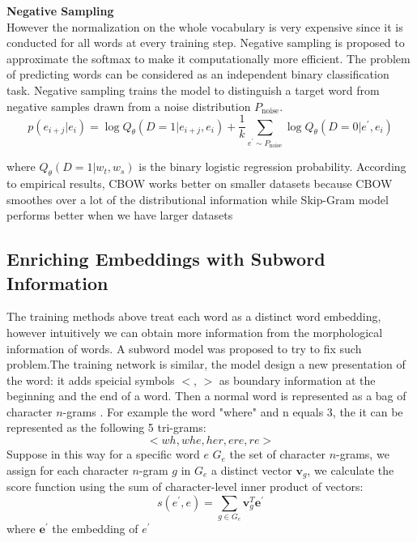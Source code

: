\textbf{Negative Sampling}\\
However the normalization on the whole vocabulary is very expensive since it is conducted for all words at every training step. Negative sampling is proposed to approximate the softmax to make it computationally more efficient. The problem of predicting words can be considered as an independent binary classification task. Negative sampling trains the model to distinguish a target word from negative samples drawn from a noise  distribution $P_{\text{noise}}$.   
\[p(e_{i+j}|e_i) = \log {Q_{\theta}{(D=1 | e_{i+j}, e_i)}} + \frac{1}{k}\sum_{e^{\prime} \sim P_{\text{noise}}} {\log{Q_{\theta}{(D=0 | e^{\prime}, e_i )}}}  \]

where ${Q_{\theta}{(D=1| w_t, w_s)}}$ is the binary logistic regression probability.
According to  empirical results, CBOW works better on smaller datasets because CBOW smoothes over a lot of the distributional information while Skip-Gram model performs better when we have larger datasets

\subsection{Enriching Embeddings with Subword Information}
The training methods above treat each word as a distinct word embedding, however intuitively we can obtain more information from the morphological information of words. A subword model was proposed to try to fix such problem.The training network is similar, the model design a new presentation of the word: it adds speicial symbols $<$, ${>}$ as boundary information at the beginning and the end of a word. Then a normal word is represented as a bag of character $n$-grams . For example the word "where" and n equals 3, the it can be represented as the following 5 tri-grams: 
\[ <wh, whe, her, ere, re>\]
Suppose in this way for a specific word $e$ ${G_{e}}$ the set of character ${n}$-grams, we assign for each character ${n}$-gram $g$ in ${G_{e}}$ a distinct vector $\bm{v}_g$, we calculate the score function using the sum of character-level inner product of vectors:
\[s(e^{\prime}, e) = \sum_{g \in G_{e}} \bm{v}_g^{T} \bm{e}^{\prime} \]
where $\bm{e}^{\prime}$ the embedding of $e^{\prime}$
